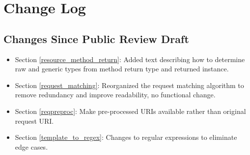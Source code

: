 \chapter{Change Log}

\section{Changes Since Public Review Draft}

\begin{itemize}
\item Section \ref{resource_method_return}: Added text describing how to determine raw and generic types from method return type and returned instance.
\item Section \ref{request_matching}: Reorganized the request matching algorithm to remove redundancy and improve readability, no functional change.
\item Section \ref{reqpreproc}: Make pre-processed URIs available rather than original request URI.
\item Section \ref{template_to_regex}: Changes to regular expressions to eliminate edge cases.
\end{itemize}